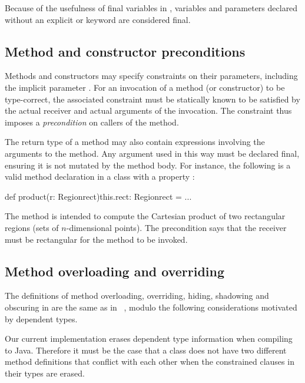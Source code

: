 Because of the usefulness of final variables in \Xten{}, variables
and parameters declared without an explicit  or 
keyword are considered final.

\subsection{Method and constructor preconditions}

Methods and constructors may specify constraints on their
parameters, including the implicit parameter .
For an invocation of a method (or constructor) to
be type-correct, the associated constraint must be statically known
to be satisfied by the actual receiver and actual arguments of
the invocation.  The constraint thus imposes a \emph{precondition}
on callers of the method.

The
return type of a method may also contain expressions involving the
arguments to the method.  Any argument used in this way must
be declared final,
ensuring it is not mutated by the method body.  For instance,
the following is a valid method declaration in a class
 with a  property :
\begin{xten}
def product(r: Region{rect}){this.rect}:
        Region{rect} = ...
\end{xten}
\noindent
The method is intended to compute the Cartesian product of two
rectangular regions (sets of $n$-dimensional points).
The precondition 
says that
the receiver must be rectangular for the method to be invoked.

\subsection{Method overloading and overriding}

The definitions of method overloading, overriding, hiding,
shadowing and obscuring in \Xten{} are the same as in
\Java~\cite{Java3}, modulo the following considerations
motivated by dependent types.

Our current implementation
erases dependent type information when compiling to Java. Therefore it
must be the case that a class does not have two different method
definitions that conflict with each other when the constrained
clauses in their types are erased.

